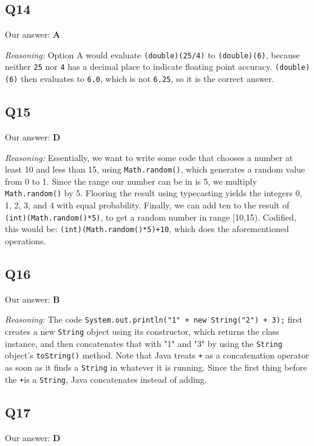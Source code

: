 \documentclass{article}
\begin{document}
\subsection{Q14}

Our answer: \textbf{A}

\noindent\textit{Reasoning:} Option A would evaluate \verb|(double)(25/4)| to \verb|(double)(6)|, because neither \verb|25| nor \verb|4| has a decimal place to indicate floating point accuracy. \verb|(double)(6)| then evaluates to \verb|6.0|, which is not \verb|6.25|, so it is the correct answer.

\subsection{Q15}

Our answer: \textbf{D}

\noindent\textit{Reasoning:} Essentially, we want to write some code that chooses a number at least 10 and less than 15, using \verb|Math.random()|, which generates a random value from 0 to 1. Since the range our number can be in is 5, we multiply \verb|Math.random()| by 5. Flooring the result using typecasting yields the integers 0, 1, 2, 3, and 4 with equal probability. Finally, we can add ten to the result of \verb|(int)(Math.random()*5)|, to get a random number in range [10,15). Codified, this would be: \verb|(int)(Math.random()*5)+10|, which does the aforementioned operations.

\subsection{Q16}

Our answer: \textbf{B}

\noindent\textit{Reasoning:} The code \verb|System.out.println("1" + new String("2") + 3);| first creates a new \verb|String| object using its constructor, which returns the class instance, and then concatenates that with "1" and "3" by using the \verb|String| object's \verb|toString()| method. Note that Java treats \verb|+| as a concatenation operator as soon as it finds a \verb|String| in whatever it is running. Since the first thing before the \verb|+|is a \verb|String|, Java concatenates instead of adding. 

\subsection{Q17}

Our answer: \textbf{D}
\end{document}
